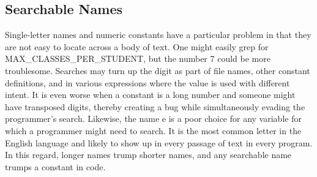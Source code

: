\subsection{Searchable Names}
Single-letter names and numeric constants have a particular problem in that they are not easy to locate across a body of text. 
One might easily grep for MAX\_CLASSES\_PER\_STUDENT, but the number 7 could be more troublesome. Searches may turn up the digit as part of file names, other constant definitions, and in various expressions where the value is used with different intent. It is even worse when a constant is a long number and someone might have transposed digits, thereby creating a bug while simultaneously evading the programmer's search. 
Likewise, the name e is a poor choice for any variable for which a programmer might need to search. It is the most common letter in the English language and likely to show up in every passage of text in every program. In this regard, longer names trump shorter names, and any searchable name trumps a constant in code. \citep{Martin-Code-2008}

